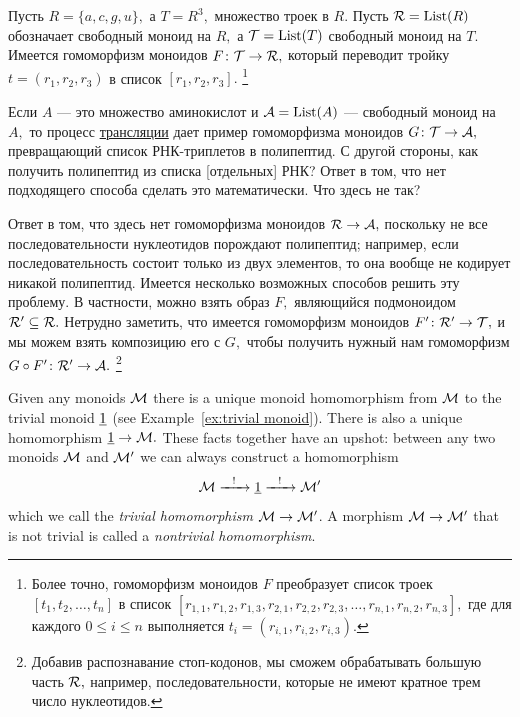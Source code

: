 \documentclass[../main/CT4S-EN-RU]{subfiles}
\begin{document}
\begin{applicationRUS}\label{app:RNA reader 1}
Пусть $R=\{a,c,g,u\},$ а $T=R^3,$ множество троек в $R.$ Пусть $\mathcal{R}=\operatorname{List}(R)$ обозначает свободный моноид на $R,$ а $\mathcal{T}=\operatorname{List}(T)$ свободный моноид на $T.$ Имеется гомоморфизм моноидов $F\colon\mathcal{T}\rightarrow\mathcal{R},$ который переводит тройку $t=(r_1,r_2,r_3)$ в список $[r_1,r_2,r_3].$
\footnote{Более точно, гомоморфизм моноидов $F$ преобразует список троек $[t_1,t_2,\ldots,t_n]$ в список $[r_{1,1},r_{1,2},r_{1,3},r_{2,1},r_{2,2},r_{2,3},\ldots,r_{n,1},r_{n,2},r_{n,3}],$ где для каждого $0\leq i\leq n$ выполняется $t_i=(r_{i,1},r_{i,2},r_{i,3}).$}

Если $A$ — это множество аминокислот и $\mathcal{A}=\operatorname{List}(A)$ — свободный моноид на $A,$ то процесс \href{https://ru.wikipedia.org/wiki/%D0%A2%D1%80%D0%B0%D0%BD%D1%81%D0%BB%D1%8F%D1%86%D0%B8%D1%8F_(%D0%B1%D0%B8%D0%BE%D0%BB%D0%BE%D0%B3%D0%B8%D1%8F)}{\text трансляции} дает пример гомоморфизма моноидов $G\colon\mathcal{T}\rightarrow\mathcal{A},$ превращающий список РНК-триплетов в полипептид. С другой стороны, как получить полипептид из списка [отдельных] РНК? Ответ в том, что нет подходящего способа сделать это математически. Что здесь не так?

Ответ в том, что здесь нет гомоморфизма моноидов $\mathcal{R}\rightarrow\mathcal{A},$ поскольку не все последовательности нуклеотидов порождают полипептид; например, если последовательность состоит только из двух элементов, то она вообще не кодирует никакой полипептид. Имеется несколько возможных способов решить эту проблему. В частности, можно взять образ $F,$ являющийся подмоноидом $\mathcal{R}'\subseteq\mathcal{R}.$ Нетрудно заметить, что имеется гомоморфизм моноидов $F'\colon\mathcal{R}'\rightarrow\mathcal{T},$ и мы можем взять композицию его с $G,$ чтобы получить нужный нам гомоморфизм $G\circ F'\colon\mathcal{R}'\rightarrow\mathcal{A}.$
\footnote{Добавив распознавание стоп-кодонов, мы сможем обрабатывать большую часть $\mathcal{R},$ например, последовательности, которые не имеют кратное трем число нуклеотидов.}
\end{applicationRUS}

\begin{exampleENG}\label{ex:trivial monoid homomorphism}
Given any monoids $\mathcal{M}$ there is a unique monoid homomorphism from $\mathcal{M}$ to the trivial monoid $\underline{1}$ (see Example~\ref{ex:trivial monoid}). There is also a unique homomorphism $\underline{1}\rightarrow\mathcal{M}.$ These facts together have an upshot: between any two monoids $\mathcal{M}$ and $\mathcal{M}'$ we can always construct a homomorphism
$$\mathcal{M}\xrightarrow{\ \ !\ \ }\underline{1}\xrightarrow{\ \ !\ \ }\mathcal{M}'$$
which we call the {\em trivial homomorphism $\mathcal{M}\rightarrow\mathcal{M}'$}. A morphism $\mathcal{M}\rightarrow\mathcal{M}'$ that is not trivial is called a {\em nontrivial homomorphism}.
\end{exampleENG}
\end{document}
